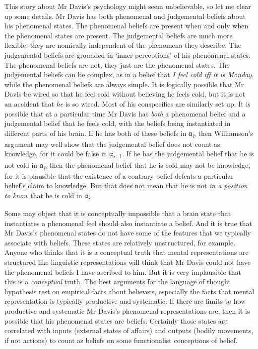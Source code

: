 \documentclass[
  10pt,
  letterpaper,
  DIV=11,
  numbers=noendperiod,
  twoside]{scrartcl}
\begin{document}
This story about Mr Davis's psychology might seem unbelievable, so let
me clear up some details. Mr Davis has both phenomenal and judgemental
beliefs about his phenomenal states. The phenomenal beliefs are present
when and only when the phenomenal states are present. The judgemental
beliefs are much more flexible, they are nomically independent of the
phenomena they describe. The judgemental beliefs are grounded in `inner
perceptions' of his phenomenal states. The phenomenal beliefs are not,
they just are the phenomenal states. The judgemental beliefs can be
complex, as in a belief that \emph{I feel cold iff it is Monday}, while
the phenomenal beliefs are always simple. It is logically possible that
Mr Davis be wired so that he feel cold without believing he feels cold,
but it is not an accident that \emph{he} is so wired. Most of his
conspecifics are similarly set up. It is possible that at a particular
time Mr Davis has \emph{both} a phenomenal belief and a judgemental
belief that he feels cold, with the beliefs being instantiated in
different parts of his brain. If he has both of these beliefs in
α\textsubscript{\emph{i}}, then Williamson's argument may well show that
the judgemental belief does not count as knowledge, for it could be
false in α\textsubscript{\emph{i}+1}. If he has the judgemental belief
that he is not cold in α\textsubscript{\emph{i}}, then the phenomenal
belief that he is cold may not be knowledge, for it is plausible that
the existence of a contrary belief defeats a particular belief's claim
to knowledge. But that does not mean that he is not \emph{in a position
to know} that he is cold in α\textsubscript{\emph{i}}.

Some may object that it is conceptually impossible that a brain state
that instantiates a phenomenal feel should also instantiate a belief.
And it is true that Mr Davis's phenomenal states do not have some of the
features that we typically associate with beliefs. These states are
relatively unstructured, for example. Anyone who thinks that it is a
conceptual truth that mental representations are structured like
linguistic representations will think that Mr Davis could not have the
phenomenal beliefs I have ascribed to him. But it is very implausible
that this is a \emph{conceptual} truth. The best arguments for the
language of thought hypothesis rest on empirical facts about believers,
especially the facts that mental representation is typically productive
and systematic. If there are limits to how productive and systematic Mr
Davis's phenomenal representations are, then it is possible that his
phenomenal states are beliefs. Certainly those states are correlated
with inputs (external states of affairs) and outputs (bodily movements,
if not actions) to count as beliefs on some functionalist conceptions of
belief.
\end{document}
